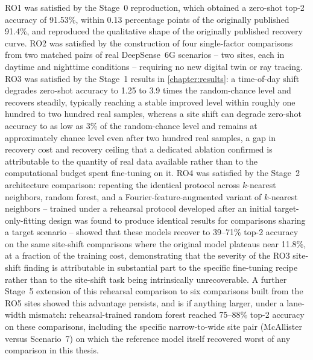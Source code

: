 \documentclass{iutbscthesis}
\begin{document}
RO1 was satisfied by the Stage~0 reproduction, which obtained a zero-shot top-2 accuracy of 91.53\%, within 0.13 percentage points of the originally published 91.4\%, and reproduced the qualitative shape of the originally published recovery curve. RO2 was satisfied by the construction of four single-factor comparisons from two matched pairs of real DeepSense~6G scenarios -- two sites, each in daytime and nighttime conditions -- requiring no new digital twin or ray tracing. RO3 was satisfied by the Stage~1 results in \autoref{chapter:results}: a time-of-day shift degrades zero-shot accuracy to 1.25 to 3.9 times the random-chance level and recovers steadily, typically reaching a stable improved level within roughly one hundred to two hundred real samples, whereas a site shift can degrade zero-shot accuracy to as low as 3\% of the random-chance level and remains at approximately chance level even after two hundred real samples, a gap in recovery cost and recovery ceiling that a dedicated ablation confirmed is attributable to the quantity of real data available rather than to the computational budget spent fine-tuning on it. RO4 was satisfied by the Stage~2 architecture comparison: repeating the identical protocol across $k$-nearest neighbors, random forest, and a Fourier-feature-augmented variant of $k$-nearest neighbors -- trained under a rehearsal protocol developed after an initial target-only-fitting design was found to produce identical results for comparisons sharing a target scenario -- showed that these models recover to 39--71\% top-2 accuracy on the same site-shift comparisons where the original model plateaus near 11.8\%, at a fraction of the training cost, demonstrating that the severity of the RO3 site-shift finding is attributable in substantial part to the specific fine-tuning recipe rather than to the site-shift task being intrinsically unrecoverable. A further Stage~5 extension of this rehearsal comparison to six comparisons built from the RO5 sites showed this advantage persists, and is if anything larger, under a lane-width mismatch: rehearsal-trained random forest reached 75--88\% top-2 accuracy on these comparisons, including the specific narrow-to-wide site pair (McAllister versus Scenario~7) on which the reference model itself recovered worst of any comparison in this thesis.
\end{document}
